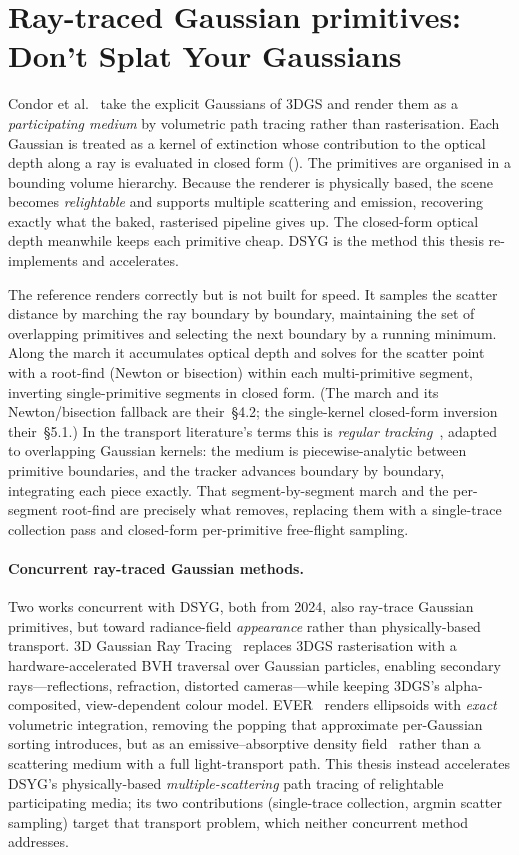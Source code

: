 \section{Ray-traced Gaussian primitives: Don't Splat Your Gaussians}
\label{sec:dsyg}

Condor et al.~\cite{DSYG} take the explicit Gaussians of 3DGS and render them as a
\emph{participating medium} by volumetric path tracing rather than rasterisation. Each Gaussian is
treated as a kernel of extinction whose contribution to the optical depth along a ray is evaluated
in closed form (). The primitives are organised in a bounding volume
hierarchy. Because the renderer is physically based, the scene becomes \emph{relightable} and
supports multiple scattering and emission, recovering exactly what the baked, rasterised pipeline
gives up. The closed-form optical depth meanwhile keeps each primitive cheap. DSYG is the method this
thesis re-implements and accelerates.

The reference renders correctly but is not built for speed. It samples the scatter distance by
marching the ray boundary by boundary, maintaining the set of overlapping primitives and selecting
the next boundary by a running minimum. Along the march it accumulates optical depth and solves for
the scatter point with a root-find (Newton or bisection) within each multi-primitive segment,
inverting single-primitive segments in closed form. (The march and its Newton/bisection fallback are
their~\S4.2; the single-kernel closed-form inversion their~\S5.1.) In the transport
literature's terms this is \emph{regular tracking}~\cite{Sutton1999,Novak2018}, adapted to
overlapping Gaussian kernels: the medium is piecewise-analytic between primitive
boundaries, and the tracker advances boundary by boundary, integrating each piece exactly. That segment-by-segment
march and the per-segment root-find are precisely what  removes, replacing them
with a single-trace collection pass and closed-form per-primitive free-flight sampling.

\paragraph{Concurrent ray-traced Gaussian methods.} Two works concurrent with DSYG, both from
2024, also ray-trace Gaussian primitives, but toward radiance-field \emph{appearance} rather than
physically-based transport. 3D Gaussian Ray Tracing~\cite{3DGRT} replaces 3DGS rasterisation with a hardware-accelerated
BVH traversal over Gaussian particles, enabling secondary rays---reflections, refraction, distorted
cameras---while keeping 3DGS's alpha-composited, view-dependent colour model. EVER~\cite{EVER} renders
ellipsoids with \emph{exact} volumetric integration, removing the popping that approximate per-Gaussian
sorting introduces, but as an emissive--absorptive density field~\cite{Max1995} rather than a scattering medium with a
full light-transport path. This thesis instead accelerates DSYG's physically-based
\emph{multiple-scattering} path tracing of relightable participating media; its two contributions
(single-trace collection, argmin scatter sampling) target that transport problem, which neither
concurrent method addresses.

